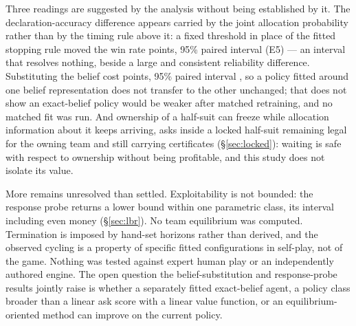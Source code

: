 Three readings are suggested by the analysis without being established by it.
The declaration-accuracy difference appears carried by the joint allocation
probability rather than by the timing rule above it: a fixed threshold in place
of the fitted stopping rule moved the win rate \numAblStop{} points, 95\% paired
interval \numAblStopCI{} (E5) --- an interval that resolves nothing, beside a
large and consistent reliability difference. Substituting the \vblock{} belief
cost \numAblBlock{} points, 95\% paired interval \numAblBlockCI{}, so a policy
fitted around one belief representation does not transfer to the other
unchanged; that does not show an exact-belief policy would be weaker after
matched retraining, and no matched fit was run. And ownership of a half-suit can
freeze while allocation information about it keeps arriving, asks inside a
locked half-suit remaining legal for the owning team and still carrying
certificates (\S\ref{sec:locked}): waiting is safe with respect to ownership
without being profitable, and this study does not isolate its value.

More remains unresolved than settled. Exploitability is not bounded: the
response probe returns a lower bound within one parametric class, its interval
including even money (\S\ref{sec:lbr}). No team equilibrium was computed.
Termination is imposed by hand-set horizons rather than derived, and the
observed cycling is a property of specific fitted configurations in self-play,
not of the game. Nothing was tested against expert human play or an
independently authored engine. The open question the belief-substitution and
response-probe results jointly raise is whether a separately fitted
exact-belief agent, a policy class broader than a linear ask score with a linear
value function, or an equilibrium-oriented method can improve on the current
\vfast{} policy.
